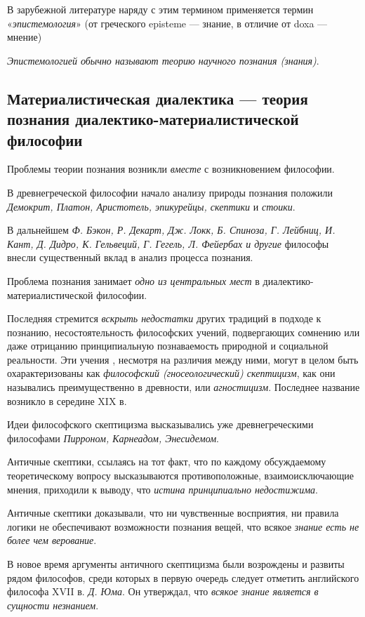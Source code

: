 \documentclass[a4paper,14pt,russian]{extreport}
\begin{document}
В зарубежной литературе наряду с этим термином применяется термин «\emph{эпистемология}» (от греческого episteme --- знание, в отличие от doxa --- мнение)

\emph{Эпистемологией обычно называют теорию научного познания (знания)}.

\subsection{Материалистическая диалектика --- теория познания диалектико-материалистической философии}

Проблемы теории познания возникли \emph{вместе} с возникновением философии.

В древнегреческой философии начало анализу природы познания положили \emph{Демокрит, Платон, Аристотель, эпикурейцы, скептики} и \emph{стоики}.

В дальнейшем \emph{Ф. Бэкон, Р. Декарт, Дж. Локк, Б. Спиноза, Г. Лейбниц, И. Кант, Д. Дидро, К. Гельвеций, Г. Гегель, Л. Фейербах и другие} философы внесли существенный вклад в анализ процесса познания.

Проблема познания занимает \emph{одно из центральных мест} в диалектико-материалистической философии.

Последняя стремится \emph{вскрыть недостатки} других традиций в подходе к познанию, несостоятельность философских учений, подвергающих сомнению или даже отрицанию принципиальную познаваемость природной и социальной реальности. Эти учения , несмотря на различия между ними, могут в целом быть охарактеризованы как \emph{философский (гносеологический) скептицизм}, как они назывались преимущественно в древности, или \emph{агностицизм}. Последнее название возникло в середине XIX в.

Идеи философского скептицизма высказывались уже древнегреческими философами \emph{Пирроном, Карнеадом, Энесидемом}.

Античные скептики, ссылаясь на тот факт, что по каждому обсуждаемому теоретическому вопросу высказываются противоположные, взаимоисключающие мнения, приходили к выводу, что \emph{истина принципиально недостижима}.

Античные скептики доказывали, что ни чувственные восприятия, ни правила логики не обеспечивают возможности познания вещей, что всякое \emph{знание есть не более чем верование}.

В новое время аргументы античного скептицизма были возрождены и развиты рядом философов, среди которых в первую очередь следует отметить английского философа XVII в. \emph{Д. Юма}. Он утверждал, что \emph{всякое знание является в сущности незнанием}.
\end{document}
